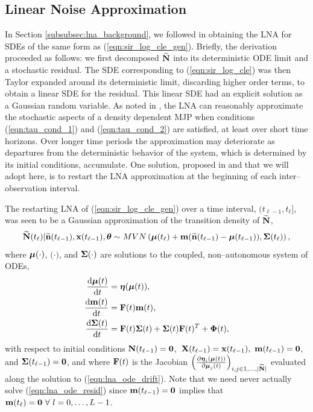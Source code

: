 \subsection{Linear Noise Approximation}
\label{subsec:sir_lna}

In Section \ref{subsubsec:lna_background}, we followed \cite{fearnhead2014,golightly2013simulation,golightly2015delayed} in obtaining the LNA for SDEs of the same form as (\ref{eqn:sir_log_cle_gen}). Briefly, the derivation proceeded as follows: we first decomposed $ \widetilde{\mathbf{N}} $ into its deterministic ODE limit and a stochastic residual. The SDE corresponding to (\ref{eqn:sir_log_cle}) was then Taylor expanded around its deterministic limit, discarding higher order terms, to obtain a linear SDE for the residual. This linear SDE had an explicit solution as a Gaussian random variable. As noted in \cite{wallace2012linear}, the LNA can reasonably approximate the stochastic aspects of a density dependent MJP when conditions (\ref{eqn:tau_cond_1}) and (\ref{eqn:tau_cond_2}) are satisfied, at least over short time horizons. Over longer time periods the approximation may deteriorate as departures from the deterministic behavior of the system, which is determined by its initial conditions, accumulate.  One solution, proposed in \cite{fearnhead2014,minas2017long} and that we will adopt here, is to restart the LNA approximation at the beginning of each inter--observation interval. 

The restarting LNA of (\ref{eqn:sir_log_cle_gen}) over a time interval, $ (t_{\ell-1},t_\ell] $, was seen to be a Gaussian approximation of the transition density of $ \widetilde{\mathbf{N}} $,
\begin{equation}
\label{eqn:lna_transition_density}
\widetilde{\mathbf{N}}(t_\ell)|\widetilde{\mathbf{n}}(t_{\ell-1}), \mathbf{x}(t_{\ell-1}),\boldsymbol{\theta} \sim MVN\left (\boldsymbol{\mu}(t_\ell) + \mathbf{m}(\widetilde{\mathbf{n}}(t_{\ell-1}) - \boldsymbol{\mu}(t_{\ell-1})), \boldsymbol{\Sigma}(t_\ell)\right ),
\end{equation}
where $ \boldsymbol{\mu}(\cdot) $, $ \bm(\cdot) $, and $ \boldsymbol{\Sigma}(\cdot) $ are solutions to the coupled, non--autonomous system of ODEs,
\begin{align}
\label{eqn:lna_ode_drift}
\frac{\mathrm{d}\boldsymbol{\mu}(t)}{\mathrm{d} t} &= \boldsymbol{\eta}(\boldsymbol{\mu}(t)),\\
\label{eqn:lna_ode_resid}
\frac{\mathrm{d}\mathbf{m}(t)}{\mathrm{d} t} &= \mathbf{F}(t)\mathbf{m}(t),\\
\label{eqn:lna_ode_diffusion}
\frac{\mathrm{d}\boldsymbol{\Sigma}(t)}{\mathrm{d} t} &= \mathbf{F}(t)\boldsymbol{\Sigma}(t) + \boldsymbol{\Sigma}(t)\mathbf{F}(t)^T + \boldsymbol{\Phi}(t),
\end{align}
with respect to initial conditions $ \mathbf{N}(t_{\ell-1}) = \boldsymbol{0} $,\ $ \mathbf{X}(t_{\ell-1}) = \mathbf{x}(t_{\ell-1}),\ \mathbf{m}(t_{\ell-1}) = \boldsymbol{0}$, and $ \boldsymbol{\Sigma}(t_{\ell-1}) = \boldsymbol{0} $, and where $ \mathbf{F}(t) $ is the Jacobian $ \left (\frac{\partial\boldsymbol{\eta}_i(\boldsymbol{\mu}(t))}{\partial\boldsymbol{\mu}_j(t)}\right )_{i,j\in{1,\dots,|\widetilde{\mathbf{N}}|}} $ evaluated along the solution to (\ref{eqn:lna_ode_drift}). Note that we need never actually solve (\ref{eqn:lna_ode_resid}) since $ \mathbf{m}(t_{\ell-1}) = \boldsymbol{0} $ implies that $ \bm(t_\ell) = \bs{0}\ \forall\ l=0,\dots,L-1$. 

